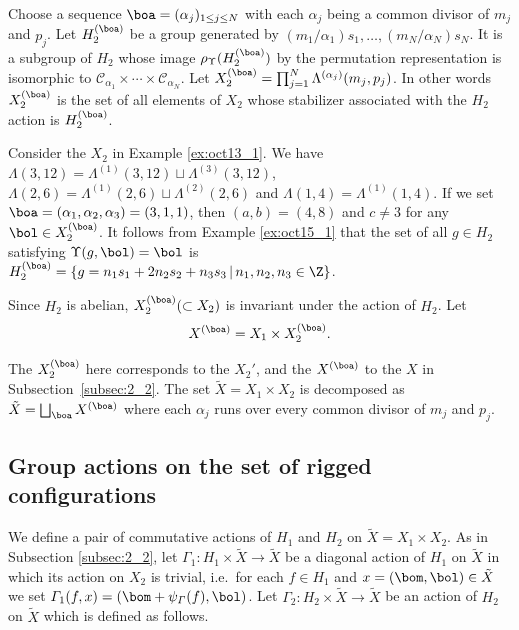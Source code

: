 Choose a sequence $\boa = (\alpha_j)_{1 \leq j \leq N}$ with
each $\alpha_j$ being a common divisor of $m_j$ and $p_j$.
Let $H_2^{(\boa)}$ be a group generated by $(m_1/\alpha_1) s_1, \ldots ,(m_N/\alpha_N) s_N$.
It is a subgroup of $H_2$ whose
image $\rho_{\Upsilon} (H_2^{(\boa)})$ by the permutation representation
is isomorphic to $\mathcal{C}_{\alpha_1} \times \cdots \times \mathcal{C}_{\alpha_N}$.
%
Let
$X_2^{(\boa)} = \prod_{j=1}^N \Lambda^{(\alpha_j)} (m_j,p_j)$.
In other words $X_2^{(\boa)}$ is the set of all elements of $X_2$ whose stabilizer
associated with the $H_2$ action is $H_2^{(\boa)}$.
\begin{example}\label{ex:oct15_2}
Consider the $X_2$ in Example \ref{ex:oct13_1}.
We have $\Lambda (3,12) = \Lambda^{(1)}(3,12) \sqcup \Lambda^{(3)}(3,12)$,
$\Lambda (2,6) = \Lambda^{(1)}(2,6) \sqcup \Lambda^{(2)}(2,6)$ and
$\Lambda (1,4) = \Lambda^{(1)}(1,4)$.
If we set $\boa = (\alpha_1, \alpha_2, \alpha_3) = (3,1,1)$,
then
$(a,b) = (4,8)$ and $c \ne 3$ for any $\bol \in X_2^{(\boa)}$.
It follows from Example \ref{ex:oct15_1} that
the set of all $g \in H_2$ satisfying $\Upsilon (g, \bol) = \bol$
is
$H_2^{(\boa)} = \{ g=  n_1 s_1 + 2 n_2 s_2 + n_3 s_3\, | \,n_1, n_2, n_3 \in \Z \}$.
\end{example}


Since $H_2$ is abelian, $X_2^{(\boa)} (\subset X_2)$ is invariant under the action of $H_2$.
Let
\begin{equation}\label{eq:apr22_2}
X^{(\boa)} = X_1 \times X_2^{(\boa)}.
\end{equation}

The $X_2^{(\boa)}$ here corresponds to the $X_2'$, and the $X^{(\boa)}$ to the $X$ in Subsection~\ref{subsec:2_2}.
The set
$\tilde{X} = X_1 \times X_2$ is decomposed as
\begin{math}
\tilde{X} = \bigsqcup_{\boa} X^{(\boa)}
\end{math}
where each $\alpha_j$ runs over every common divisor of $m_j$ and $p_j$.

\subsection{Group actions on the set of rigged conf\/igurations}\label{subsec:3_3}
We def\/ine a pair of commutative actions of $H_1$ and $H_2$ on $\tilde{X} = X_1 \times X_2$.
As in Subsection \ref{subsec:2_2}, let $\varGamma_1 : H_1 \times \tilde{X} \rightarrow \tilde{X}$
be a diagonal action of
$H_1$ on $\tilde{X}$
in which its action on $X_2$ is trivial, i.e.~for each $f \in H_1$ and $x =(\bom,\bol) \in \tilde{X}$
we set
$\varGamma_1(f, x) = (\bom + \psi_\varGamma (f), \bol)$.
Let
$\varGamma_2 : H_2 \times \tilde{X} \rightarrow \tilde{X}$
be an action of
$H_2$ on $\tilde{X}$
which is def\/ined as follows.

